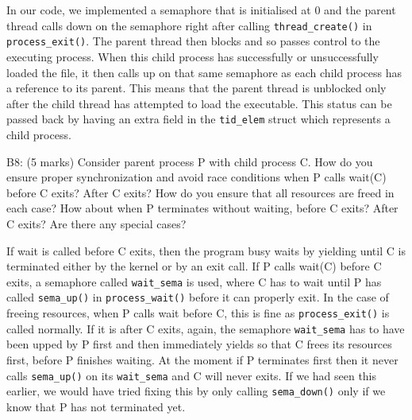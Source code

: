 

In our code, we implemented a semaphore that is initialised at 0 and the parent thread calls down on the semaphore right after calling \texttt{thread\_create()} in \texttt{process\_exit()}. The parent thread then blocks and so passes control to the executing process. When this child process has successfully or unsuccessfully loaded the file, it then calls up on that same semaphore as each child process has a reference to its parent. This means that the parent thread is unblocked only after the child thread has attempted to load the executable. This status can be passed back by having an extra field in the \texttt{tid\_elem} struct which represents a child process.


\noindent B8: (5 marks)
Consider parent process P with child process C.  How do you
ensure proper synchronization and avoid race conditions when P
calls wait(C) before C exits?  After C exits?  How do you ensure
that all resources are freed in each case?  How about when P
terminates without waiting, before C exits?  After C exits?  Are
there any special cases?


If wait is called before C exits, then the program busy waits by yielding until C is terminated either by the kernel or by an exit call. If P calls wait(C) before C exits, a semaphore called \texttt{wait\_sema} is used, where C has to wait until P has called \texttt{sema\_up()} in \texttt{process\_wait()} before it can properly exit. In the case of freeing resources, when P calls wait before C, this is fine as \texttt{process\_exit()} is called normally. If it is after C exits, again, the semaphore \texttt{wait\_sema} has to have been upped by P first and then immediately yields so that C frees its resources first, before P finishes waiting. At the moment if P terminates first then it never calls \texttt{sema\_up()} on its \texttt{wait\_sema} and C will never exits. If we had seen this earlier, we would have tried fixing this by only calling \texttt{sema\_down()} only if we know that P has not terminated yet.



